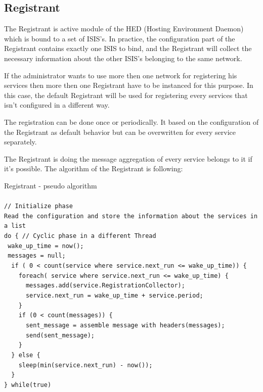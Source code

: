 \documentclass{article}                            %
\begin{document}
\subsection{Registrant}
\label{Registrant}
The Registrant is active module of the HED (Hosting Environment Daemon) which is bound to a set of ISIS's. In practice, the configuration part of the Registrant contains exactly one ISIS to bind, and the Registrant will collect the necessary information about the other ISIS's belonging to the same network.\par
If the administrator wants to use more then one network for registering his services then more then one Registrant have to be instanced for this purpose. In this case, the default Registrant will be used for registering every services that isn't configured in a different way. \par
The registration can be done once or periodically. It based on the configuration of the Registrant as default behavior but can be overwritten for every service separately.\par
The Registrant is doing the message aggregation of every service belongs to it if it's possible. The algorithm of the Registrant is following:
\begin{framed}
  Registrant - pseudo algorithm\\
  \\
  \verb#// Initialize phase#\\
  \verb#Read the configuration and store the information about the services in a list#\\
  \verb#do { // Cyclic phase in a different Thread#\\
  \verb# wake_up_time = now();#\\
  \verb# messages = null;#\\
  \verb#  if ( 0 < count(service where service.next_run <= wake_up_time)) {#\\
  \verb#    foreach( service where service.next_run <= wake_up_time) {#\\
  \verb#      messages.add(service.RegistrationCollector);#\\
  \verb#      service.next_run = wake_up_time + service.period;#\\
  \verb#    }#\\
  \verb#    if (0 < count(messages)) {#\\
  \verb#      sent_message = assemble message with headers(messages);#\\
  \verb#      send(sent_message);#\\
  \verb#    }#\\
  \verb#  } else {#\\
  \verb#    sleep(min(service.next_run) - now()); #\\
  \verb#  }#\\
  \verb#} while(true)#\\
\end{framed}
\end{document}
